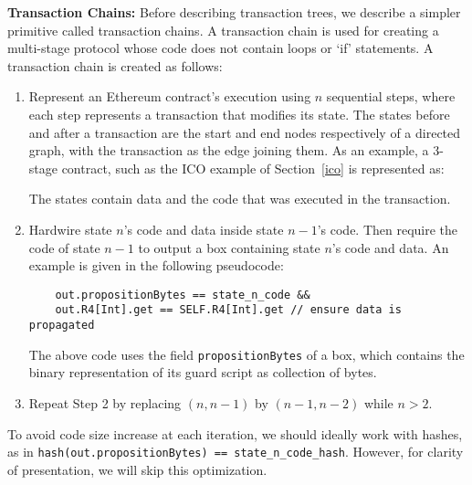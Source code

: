 \documentclass[runningheads]{llncs}
\newcommand{\node}{\mathsf{t}}
\begin{document}
\textbf{Transaction Chains:} Before describing transaction trees, we describe a simpler primitive called transaction chains. A transaction chain is used for creating a multi-stage protocol whose code does not contain loops or `if' statements. A transaction chain is created as follows:
\begin{enumerate}
	\item Represent an Ethereum contract's execution using $n$ sequential steps, where each step represents a transaction that modifies its state.
The states before and after a transaction are the start and end nodes respectively of a directed graph, with the transaction as the edge joining them. 
	As an example, a 3-stage contract, such as the ICO example of Section~\ref{ico} is represented as:
	
	
	The states contain data and the code that was executed in the transaction.
	\item Hardwire state $n$'s code and data inside state $n-1$'s code. Then require the code of state $n-1$ to output a box containing state $n$'s code and data. An example is given in the following pseudocode:
	\begin{verbatim}
	out.propositionBytes == state_n_code &&  
	out.R4[Int].get == SELF.R4[Int].get // ensure data is propagated
	\end{verbatim}
	
	The above code uses the field \texttt{propositionBytes} of a box, which contains the binary representation of its guard script as collection of bytes.
	
	
	\item Repeat Step 2 by replacing $(n, n-1)$ by $(n-1, n-2)$ while $n > 2$.
\end{enumerate}

To avoid code size increase at each iteration, we should ideally work with hashes, as in \texttt{hash(out.propositionBytes) == state\_n\_code\_hash}. However, for clarity of presentation, we will skip this optimization.
 
\end{document}
